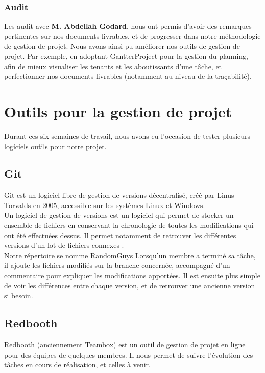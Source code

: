 \subsubsection{Audit}

Les audit avec \textbf{M. Abdellah Godard}, nous ont permis d'avoir des remarques pertinentes sur nos documents livrables, et de progresser dans notre méthodologie de gestion de projet. Nous avons ainsi pu améliorer nos outils de gestion de projet. Par exemple, en adoptant GantterProject pour la gestion du planning, afin de mieux visualiser les tenants et les aboutissants d'une tâche, et perfectionner nos documents livrables (notamment au niveau de la traçabilité).

\section{Outils pour la gestion de projet}

Durant ces six semaines de travail, nous avons eu l'occasion de tester plusieurs logiciels outils pour notre projet.

\subsection{Git}

Git est un logiciel libre de gestion de versions décentralisé, créé par Linus Torvalds en 2005, accessible sur les systèmes Linux et Windows.\\
Un logiciel de gestion de versions est un logiciel qui permet de stocker un ensemble de fichiers en conservant la chronologie de toutes les modifications qui ont été effectuées dessus. Il permet notamment de retrouver les différentes versions d’un lot de fichiers connexes \cite{wikigit}.\\
Notre répertoire se nomme RandomGuys \cite{notregit}
Lorsqu'un membre a terminé sa tâche, il ajoute les fichiers modifiés sur la branche concernée, accompagné d'un commentaire pour expliquer les modifications apportées. Il est ensuite plus simple de voir les différences entre chaque version, et de retrouver une ancienne version si besoin.\\

\subsection{Redbooth}

Redbooth (anciennement Teambox) \cite{teambox} est un outil de gestion de projet en ligne pour des équipes de quelques membres. Il nous permet de suivre l'évolution des tâches en cours de réalisation, et celles à venir. 

